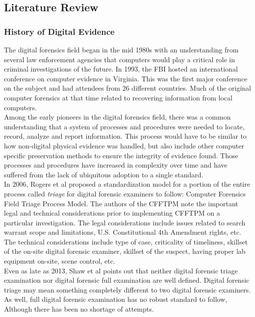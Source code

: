 \documentclass[12pt]{article}
\begin{document}
\subsection{Literature Review}
\subsubsection{History of Digital Evidence}

The digital forensics field began in the mid 1980s with an understanding from several law enforcement
agencies that computers would play a critical role in criminal investigations of the future.
In 1993, the FBI hosted an international conference on computer evidence in Virginia.  This was
the first major conference on the subject and had attendees from 26 different countries.  Much
of the original computer
forensics at that time related to recovering information from local computers.\\

Among the early pioneers in the digital forensics field, there was a common understanding that a
system of processes and procedures were needed to locate, record, analyze and report information.
This process would have to be similar to how non-digital physical evidence was handled, but also
include other computer specific preservation methods to ensure the integrity of evidence found.
Those processes and procedures have increased in complexity over time and have suffered from the
lack of ubiquitous adoption to a single standard.\\

In 2006, Rogers et al\cite{rogers2006computer} proposed a standardization model for a portion
of the entire process called {\em triage} for digital
forensic examiners to follow: Computer Forensics Field Triage Process Model.
The authors of the CFFTPM note the important legal and technical
considerations prior to implementing CFFTPM on a particular investigation.  The legal
considerations include issues
related to search warrant scope and limitations, U.S. Constitutional 4th Amendment rights, etc.
The technical 
considerations include type of case, criticality of timeliness, skillset of the on-site
digital forensic examiner, 
skillset of the suspect, having proper lab equipment on-site, scene control, etc.\\

Even as late as 2013, Shaw et al\cite{shaw2013practical} points out that neither digital forensic
triage examination nor digital forensic full examination are well defined.
Digital forensic triage may mean something completely different to two digital forensic
examiners.  As well, full digital forensic examination has no robust standard to follow, Although
there has been no shortage of attempts.\\
\end{document}
